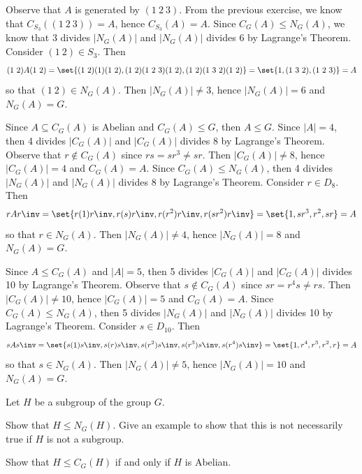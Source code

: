 \begin{solalph}
    \item Observe that $A$ is generated by $(1\ 2\ 3)$. From the previous exercise, we know that $C_{S_3}((1\ 2\ 3)) = A$, hence $C_{S_3}(A) = A$. Since $C_G(A) \leq N_G(A)$, we know that 3 divides $|N_G(A)|$ and $|N_G(A)|$ divides 6 by Lagrange's Theorem. Consider $(1\ 2) \in S_3$. Then
    \[(1\ 2)A(1\ 2) = \set{(1\ 2)(1)(1\ 2), (1\ 2)(1\ 2\ 3)(1\ 2), (1\ 2)(1\ 3\ 2)(1\ 2)} = \set{1, (1\ 3\ 2), (1\ 2\ 3)} = A\]
    so that $(1\ 2) \in N_G(A)$. Then $|N_G(A)| \neq 3$, hence $|N_G(A)| = 6$ and $N_G(A) = G$.
    \item Since $A \subseteq C_G(A)$ is Abelian and $C_G(A) \leq G$, then $A \leq G$. Since $|A| = 4$, then 4 divides $|C_G(A)|$ and $|C_G(A)|$ divides 8 by Lagrange's Theorem. Observe that $r \not\in C_G(A)$ since $rs = sr^3 \neq sr$. Then $|C_G(A)| \neq 8$, hence $|C_G(A)| = 4$ and $C_G(A) = A$. Since $C_G(A) \leq N_G(A)$, then 4 divides $|N_G(A)|$ and $|N_G(A)|$ divides 8 by Lagrange's Theorem. Consider $r \in D_8$. Then
    \[rA r\inv = \set{r(1)r\inv, r(s)r\inv, r(r^2)r\inv, r(sr^2)r\inv} = \set{1, sr^3, r^2, sr} = A\]
    so that $r \in N_G(A)$. Then $|N_G(A)| \neq 4$, hence $|N_G(A)| = 8$ and $N_G(A) = G$.
    \item Since $A \leq C_G(A)$ and $|A| = 5$, then 5 divides $|C_G(A)|$ and $|C_G(A)|$ divides 10 by Lagrange's Theorem. Observe that $s \not\in C_G(A)$ since $sr = r^4 s \neq rs$. Then $|C_G(A)| \neq 10$, hence $|C_G(A)| = 5$ and $C_G(A) = A$. Since $C_G(A) \leq N_G(A)$, then 5 divides $|N_G(A)|$ and $|N_G(A)|$ divides 10 by Lagrange's Theorem. Consider $s \in D_{10}$. Then
    \[s A s\inv = \set{s(1)s\inv, s(r)s\inv, s(r^2)s\inv, s(r^3)s\inv, s(r^4)s\inv} = \set{1, r^4, r^3, r^2, r} = A\]
    so that $s \in N_G(A)$. Then $|N_G(A)| \neq 5$, hence $|N_G(A)| = 10$ and $N_G(A) = G$.
\end{solalph}

\begin{exercise} \label{ex2.2.6}
    Let $H$ be a subgroup of the group $G.$
    \begin{subproblems}
        \item Show that $H\le N_G(H).$ Give an example to show that this is not necessarily true if $H$ is not a subgroup.
        \item Show that $H\le C_G(H)$ if and only if $H$ is Abelian.
    \end{subproblems}
\end{exercise}

